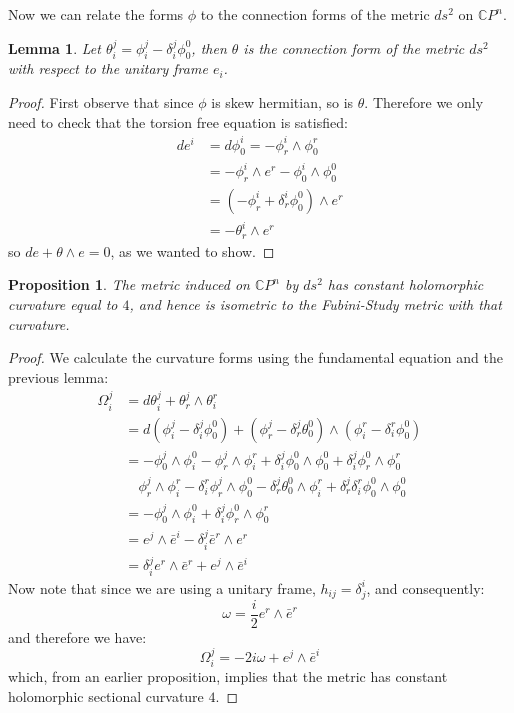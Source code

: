 \documentclass[11pt]{amsart}
\newtheorem{lem}[subsection]{Lemma}
\newtheorem{prop}[subsection]{Proposition}
\theoremstyle{definition}
\def \CP{ \mathbb{C}P }
\begin{document}
Now we can relate the forms $\phi$ to the connection forms of the metric $ds^2$ on $\CP^n$.
%
\begin{lem}  Let $ \theta^j_i = \phi^j_i - \delta^j_i \phi^0_0 $, then $\theta$ is the connection form of the metric $ds^2$ with respect to the unitary frame $e_i$.
\end{lem}
%
\begin{proof}  First observe that since $\phi$ is skew hermitian, so is $\theta$.  Therefore we only need to check that the torsion free equation is satisfied:
%
\begin{align*}
d e^i &= d \phi^i_0 = - \phi^i_r \wedge \phi^r_0 \\
&= - \phi^i_r \wedge e^r - \phi^i_0 \wedge \phi^0_0 \\
&= ( - \phi^i_r + \delta^i_r \phi^0_0 ) \wedge e^r \\
&= - \theta^i_r \wedge e^r
\end{align*} 
%
so $d e + \theta \wedge e = 0$, as we wanted to show.
%
\end{proof}
%
\begin{prop} The metric induced on $\CP^n$ by $ds^2$ has constant holomorphic curvature equal to $4$, and hence is isometric to the Fubini-Study metric with that curvature.
\end{prop}
%
\begin{proof}
%
We calculate the curvature forms using the fundamental equation and the previous lemma:
%
\begin{align*}
\Omega^j_i &= d \theta^j_i + \theta^j_r \wedge \theta^r_i \\
&= d( \phi^j_i - \delta^j_i \phi^0_0 ) + ( \phi^j_r - \delta^j_r \theta^0_0 ) \wedge ( \phi^r_i - \delta^r_i \phi^0_0 ) \\
%
&= - \phi^j_0 \wedge \phi^0_i - \phi^j_r \wedge \phi^r_i + \delta^j_i \phi^0_0 \wedge \phi^0_0 + \delta^j_i \phi^0_r \wedge \phi^r_0 \\
& \quad \phi^j_r \wedge \phi^r_i - \delta^r_i \phi^j_r \wedge \phi^0_0 - \delta^j_r \theta^0_0 \wedge \phi^r_i + \delta^j_r \delta^r_i \phi^0_0 \wedge \phi^0_0 \\
%
&= - \phi^j_0 \wedge \phi^0_i + \delta^j_i \phi^0_r \wedge \phi^r_0 \\
&= e^j \wedge \bar{e}^i - \delta^j_i \bar{e}^r \wedge e^r \\
&= \delta^j_i e^r \wedge \bar{e}^r + e^j \wedge \bar{e}^i 
\end{align*}
%
Now note that since we are using a unitary frame, $h_{ij} = \delta^i_j$, and consequently:
%
$$ \omega = \frac{i}{2} e^r \wedge \bar{e}^r $$
%
and therefore we have:
%
$$ \Omega^j_i = - 2 i \omega + e^j \wedge \bar{e}^i $$
%
which, from an earlier proposition, implies that the metric has constant holomorphic sectional curvature $4$.
\end{proof}
\end{document}
